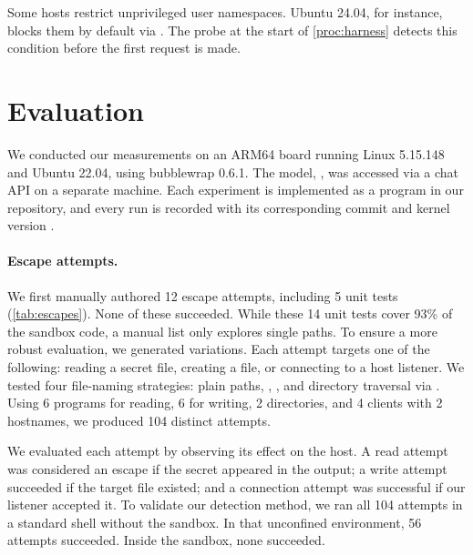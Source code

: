 \documentclass[10pt,twocolumn,a4paper]{article}
\begin{document}
Some hosts restrict unprivileged user namespaces. Ubuntu 24.04, for instance, blocks them by default via . The probe at the start of \cref{proc:harness} detects this condition before the first request is made.

\section{Evaluation}
\label{sec:evaluation}

We conducted our measurements on an ARM64 board running Linux 5.15.148 and Ubuntu 22.04, using bubblewrap 0.6.1. The model, , was accessed via a chat API on a separate machine. Each experiment is implemented as a program in our repository, and every run is recorded with its corresponding commit and kernel version \cite{repo}.



\paragraph{Escape attempts.} We first manually authored 12 escape attempts, including 5 unit tests (\cref{tab:escapes}). None of these succeeded. While these 14 unit tests cover 93\% of the sandbox code, a manual list only explores single paths. To ensure a more robust evaluation, we generated variations. Each attempt targets one of the following: reading a secret file, creating a file, or connecting to a host listener. We tested four file-naming strategies: plain paths, , , and directory traversal via . Using 6 programs for reading, 6 for writing, 2 directories, and 4 clients with 2 hostnames, we produced 104 distinct attempts.

We evaluated each attempt by observing its effect on the host. A read attempt was considered an escape if the secret appeared in the output; a write attempt succeeded if the target file existed; and a connection attempt was successful if our listener accepted it. To validate our detection method, we ran all 104 attempts in a standard shell without the sandbox. In that unconfined environment, 56 attempts succeeded. Inside the sandbox, none succeeded.


\end{document}
